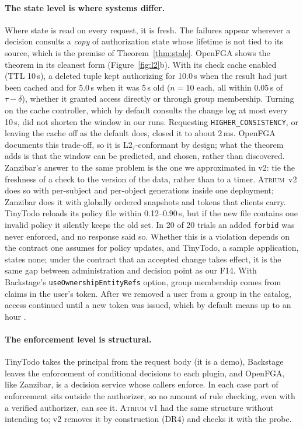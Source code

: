 \documentclass[sigconf,review,anonymous]{acmart}
\newcommand{\sysname}{\textsc{Atrium}\xspace}
\newcommand{\sysname}{\textsc{OpenZTAC}\xspace}
\begin{document}
\paragraph{The state level is where systems differ.} Where state is read on every request, it is fresh. The
failures appear wherever a decision consults a \emph{copy} of authorization state whose lifetime is not tied to
its source, which is the premise of Theorem~\ref{thm:stale}. OpenFGA shows the theorem in its cleanest form
(Figure~\ref{fig:l2}b). With its check cache enabled (TTL 10\,s), a deleted tuple kept authorizing for 10.0\,s when
the result had just been cached and for 5.0\,s when it was 5\,s old ($n=10$ each, all within 0.05\,s of
$\tau-\delta$), whether it granted access directly or through group membership. Turning on the cache controller,
which by default consults the change log at most every 10\,s, did not shorten the window in our runs. Requesting
\texttt{HIGHER\_CONSISTENCY}, or leaving the cache off as the default does, closed it to about 2\,ms. OpenFGA
documents this trade-off, so it is L2$_\tau$-conformant by design; what the theorem adds is that the window can
be predicted, and chosen, rather than discovered. Zanzibar's answer to the same problem is the one we
approximated in v2: tie the freshness of a check to the version of the data, rather than to a timer.
\sysname~v2 does so with per-subject and per-object generations inside one deployment; Zanzibar does it with
globally ordered snapshots and tokens that clients carry. TinyTodo reloads its policy file within 0.12--0.90\,s,
but if the new file contains one invalid policy it silently keeps the old set. In 20 of 20 trials an added
\texttt{forbid} was never enforced, and no response said so. Whether this is a violation depends on the
contract one assumes for policy updates, and TinyTodo, a sample application, states none; under the contract
that an accepted change takes effect, it is the same gap between administration and decision point as our F14. With Backstage's \texttt{useOwnershipEntityRefs} option, group membership comes from
claims in the user's token. After we removed a user from a group in the catalog, access continued until a new
token was issued, which by default means up to an hour \cite{backstageauth}.

\paragraph{The enforcement level is structural.} TinyTodo takes the principal from the request body (it is a
demo), Backstage leaves the enforcement of conditional decisions to each plugin, and OpenFGA, like Zanzibar, is a
decision service whose callers enforce. In each case part of enforcement sits outside the authorizer, so no
amount of rule checking, even with a verified authorizer, can see it. \sysname v1 had the same structure without
intending to; v2 removes it by construction (DR4) and checks it with the probe.
\end{document}
